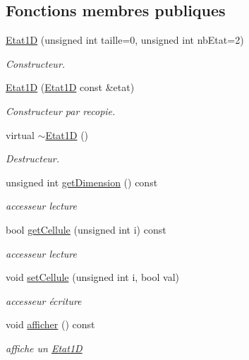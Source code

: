 \subsection*{Fonctions membres publiques}
\begin{DoxyCompactItemize}
\item 
\hyperlink{class_etat1_d_ae9cabf1b4a858c1c0c458387b52a8ce4}{Etat1D} (unsigned int taille=0, unsigned int nb\+Etat=2)
\begin{DoxyCompactList}\small\item\em Constructeur. \end{DoxyCompactList}\item 
\hyperlink{class_etat1_d_a1294037bb4f90d1da9deb872caa2cbe9}{Etat1D} (\hyperlink{class_etat1_d}{Etat1D} const \&etat)
\begin{DoxyCompactList}\small\item\em Constructeur par recopie. \end{DoxyCompactList}\item 
virtual \hyperlink{class_etat1_d_aba338e321568e641e7c3d4e9ef5e13e7}{$\sim$\+Etat1D} ()
\begin{DoxyCompactList}\small\item\em Destructeur. \end{DoxyCompactList}\item 
unsigned int \hyperlink{class_etat1_d_ab34b895c79fecfb41fac13e180c13302}{get\+Dimension} () const 
\begin{DoxyCompactList}\small\item\em accesseur lecture \end{DoxyCompactList}\item 
bool \hyperlink{class_etat1_d_a4a969863ec0067872148b326cea0cf4e}{get\+Cellule} (unsigned int i) const 
\begin{DoxyCompactList}\small\item\em accesseur lecture \end{DoxyCompactList}\item 
void \hyperlink{class_etat1_d_a04dc19eb1adbfe392eff45c7c5880c74}{set\+Cellule} (unsigned int i, bool val)
\begin{DoxyCompactList}\small\item\em accesseur écriture \end{DoxyCompactList}\item 
void \hyperlink{class_etat1_d_a11b2e64dc835aad04a5f138337ba7b99}{afficher} () const 
\begin{DoxyCompactList}\small\item\em affiche un \hyperlink{class_etat1_d}{Etat1D} \end{DoxyCompactList}\item 

\end{DoxyCompactItemize}
